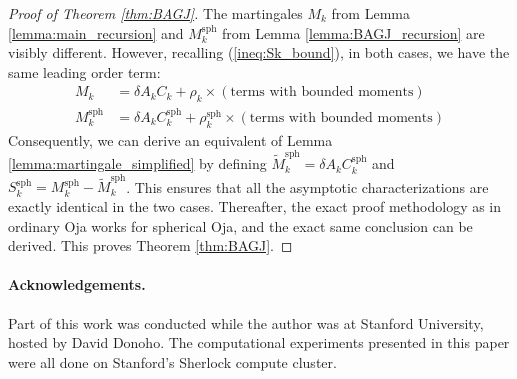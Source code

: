 \documentclass[12pt]{article}
\newcommand{\sph}{\text{sph}}
\begin{document}
\medskip

\begin{proof}[Proof of Theorem \ref{thm:BAGJ}]
    The martingales $M_k$ from Lemma \ref{lemma:main_recursion} and $M_k^\sph$ from Lemma \ref{lemma:BAGJ_recursion} are visibly different. However, recalling (\ref{ineq:Sk_bound}), in both cases, we have the same leading order term:
\begin{align*}
    M_k &= \delta A_k C_k + \rho_k \times (\text{terms with bounded moments})\\
    M_k^\sph &= \delta A_k C_k^\sph + \rho^\sph_k \times (\text{terms with bounded moments})
\end{align*}Consequently, we can derive an equivalent of Lemma \ref{lemma:martingale_simplified} by defining $\tilde M_k^\sph = \delta A_kC_k^\sph$ and $S_k^\sph=M_k^\sph-\tilde M_k^\sph$. This ensures that all the asymptotic characterizations are exactly identical in the two cases. Thereafter, the exact proof methodology as in ordinary Oja works for spherical Oja, and the exact same conclusion can be derived. This proves Theorem \ref{thm:BAGJ}.
\end{proof}

\paragraph{Acknowledgements.} Part of this work was conducted while the author was at Stanford University, hosted by David Donoho. The computational experiments presented in this paper were all done on Stanford's Sherlock compute cluster.



% 
% 


% 
\end{document}
